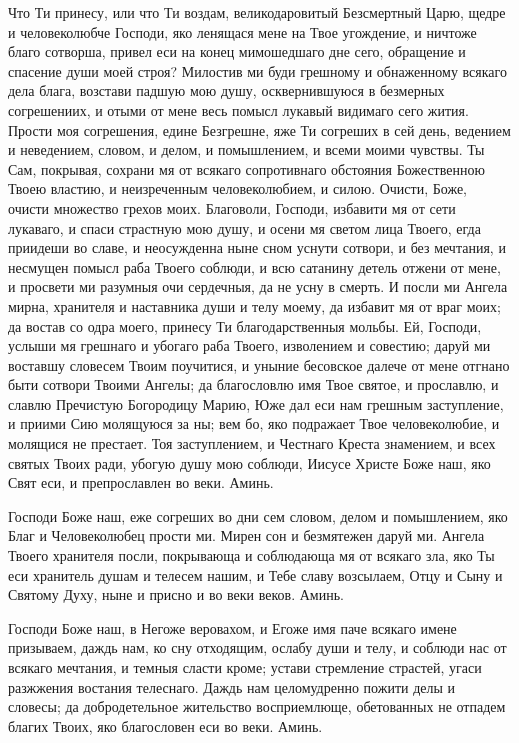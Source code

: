 \begin{mymulticols}
Что Ти принесу, или что Ти воздам, великодаровитый Безсмертный Царю, щедре и человеколюбче Господи, яко ленящася мене на Твое угождение, и ничтоже благо сотворша, привел еси на конец мимошедшаго дне сего, обращение и спасение души моей строя? Милостив ми буди грешному и обнаженному всякаго дела блага, возстави падшую мою душу, осквернившуюся в безмерных согрешениих, и отыми от мене весь помысл лукавый видимаго сего жития. Прости моя согрешения, едине Безгрешне, яже Ти согреших в сей день, ведением и неведением, словом, и делом, и помышлением, и всеми моими чувствы. Ты Сам, покрывая, сохрани мя от всякаго сопротивнаго обстояния Божественною Твоею властию, и неизреченным человеколюбием, и силою. Очисти, Боже, очисти множество грехов моих. Благоволи, Господи, избавити мя от сети лукаваго, и спаси страстную мою душу, и осени мя светом лица Твоего, егда приидеши во славе, и неосужденна ныне сном уснути сотвори, и без мечтания, и несмущен помысл раба Твоего соблюди, и всю сатанину детель отжени от мене, и просвети ми разумныя очи сердечныя, да не усну в смерть. И посли ми Ангела мирна, хранителя и наставника души и телу моему, да избавит мя от враг моих; да востав со одра моего, принесу Ти благодарственныя мольбы. Ей, Господи, услыши мя грешнаго и убогаго раба Твоего, изволением и совестию; даруй ми воставшу словесем Твоим поучитися, и уныние бесовское далече от мене отгнано быти сотвори Твоими Ангелы; да благословлю имя Твое святое, и прославлю, и славлю Пречистую Богородицу Марию, Юже дал еси нам грешным заступление, и приими Сию молящуюся за ны; вем бо, яко подражает Твое человеколюбие, и молящися не престает. Тоя заступлением, и Честнаго Креста знамением, и всех святых Твоих ради, убогую душу мою соблюди, Иисусе Христе Боже наш, яко Свят еси, и препрославлен во веки. Аминь.


Господи Боже наш, еже согреших во дни сем словом, делом и помышлением, яко Благ и Человеколюбец прости ми. Мирен сон и безмятежен даруй ми. Ангела Твоего хранителя посли, покрывающа и соблюдающа мя от всякаго зла, яко Ты еси хранитель душам и телесем нашим, и Тебе славу возсылаем, Отцу и Сыну и Святому Духу, ныне и присно и во веки веков. Аминь.


Господи Боже наш, в Негоже веровахом, и Егоже имя паче всякаго имене призываем, даждь нам, ко сну отходящим, ослабу души и телу, и соблюди нас от всякаго мечтания, и темныя сласти кроме; устави стремление страстей, угаси разжжения востания телеснаго. Даждь нам целомудренно пожити делы и словесы; да добродетельное жительство восприемлюще, обетованных не отпадем благих Твоих, яко благословен еси во веки. Аминь.


\end{mymulticols}
